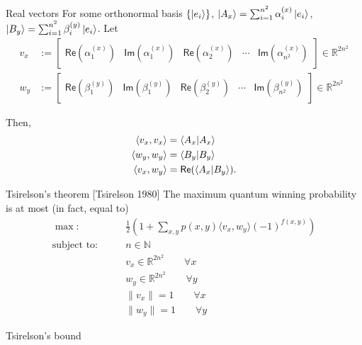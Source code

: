 \documentclass{beamer}
\newcommand\emm[1]{\textcolor{redorange}{{#1}}}
\begin{document}
\begin{frame}{Real vectors}
For some orthonormal basis $\{\ket{e_i}\}$,
$\ket{A_x}=\sum_{i=1}^{n^2} \alpha_i^{(x)}\ket{e_i}$,
$\ket{B_y}=\sum_{i=1}^{n^2} \beta_i^{(y)}\ket{e_i}$.
Let
\begin{align*}
v_x &:= \begin{bmatrix}\mathsf{Re}(\alpha_1^{(x)})& \mathsf{Im}(\alpha_1^{(x)}) &\mathsf{Re}(\alpha_2^{(x)})&\dotsm&\mathsf{Im}(\alpha_{n^2}^{(x)})\end{bmatrix}\in\mathbb{R}^{2n^2}\\
w_y &:= \begin{bmatrix}\mathsf{Re}(\beta_1^{(y)})& \mathsf{Im}(\beta_1^{(y)}) &\mathsf{Re}(\beta_2^{(y)})&\dotsm&\mathsf{Im}(\beta_{n^2}^{(y)})\end{bmatrix}\in\mathbb{R}^{2n^2}
\end{align*}

\vspace{2em}
Then,
\begin{align*}
\langle v_x, v_x\rangle &= \braket{A_x|A_x}\\
\langle w_y, w_y\rangle &= \braket{B_y|B_y}\\
\langle v_x, w_y\rangle &= \mathsf{Re}(\braket{A_x|B_y}).
\end{align*}
\end{frame}

\begin{frame}{Tsirelson's theorem [Tsirelson 1980]}
\small
The maximum quantum winning probability is \emm{at most (in fact, equal to)}
\begin{align*}
\max\colon\qquad& \frac12\left(1 + \sum_{x,y}p(x,y) \langle v_x, w_y\rangle(-1)^{f(x,y)}\right)\\
\text{subject to}\colon\qquad&
n\in\mathbb{N}\\
&v_x \in \mathbb{R}^{2n^2}\qquad \forall x\\
&w_y \in \mathbb{R}^{2n^2}\qquad \forall y\\
&\|v_x\| = 1\qquad \forall x\\
&\|w_y\| = 1\qquad \forall y
\end{align*}

\vspace{3em}
\centering\Large
Tsirelson's bound
\end{frame}
\end{document}

